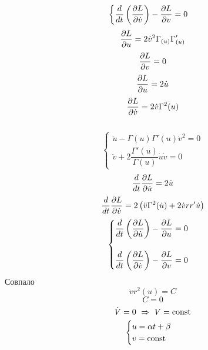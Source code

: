 \documentclass[main]{sub\Phiiles}
\begin{document}
\begin{Sol}
\[\begin{cases}
            \dfrac{d}{dt} \left(\dfrac{\partial L}{\partial \dot{v}}\right) - \dfrac{\partial L}{\partial v} = 0
        \end{cases}\]
        \[\dfrac{\partial L}{\partial u} = 2 \dot{v}^2 \Gamma_{(u)} \Gamma_{(u)}'\]
        \[\dfrac{\partial L}{\partial v} = 0\]
        \[\dfrac{\partial L}{\partial u} = 2 \dot{u}\]
        \[\dfrac{\partial L}{\partial \dot{v}} = 2 \dot{v} \Gamma^2(u)\]\
        \[\begin{cases}
            \ddot{u} - \Gamma(u) \Gamma'(u) \dot{v}^2 = 0\\
            \ddot{v} + 2 \dfrac{\Gamma'(u)}{\Gamma(u)} \dot{u} \dot{v} = 0
        \end{cases}\]
        \[\dfrac{d}{dt}\dfrac{\partial L}{\partial \dot{u}} = 2 \ddot{u}\]
        \[\dfrac{d}{dt}\dfrac{\partial L}{\partial \dot{v}} = 2 \left(\ddot{v} \Gamma^2(\dot{u}) + 2\dot{v} r r' \dot{u}\right)\]
        \[\begin{cases}
            \dfrac{d}{dt} \left(\dfrac{\partial L}{\partial \dot{u}}\right) - \dfrac{\partial L}{\partial u} = 0\\ \\
            \dfrac{d}{dt} \left(\dfrac{\partial L}{\partial \dot{v}}\right) - \dfrac{\partial L}{\partial v} = 0
        \end{cases}\]
        Совпало
        \[\dot{v} r^2 (u) = C\]
        \[C = 0\]
        \[\dot{V} = 0 \ \Rightarrow\  V = \mathop{\rm const}\nolimits\]
        \[\begin{cases}
            u = \alpha t + \beta\\
            v = \mathop{\rm const}\nolimits
        \end{cases}\]
    \end{Sol}
\end{document}
